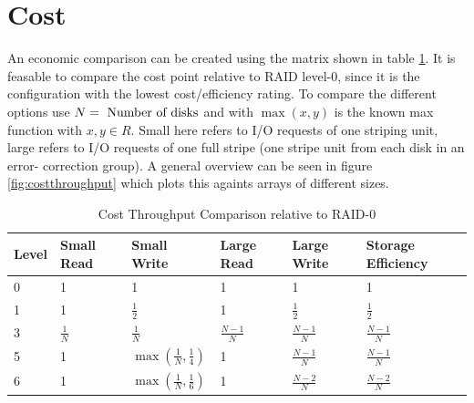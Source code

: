 \documentclass{article}
\begin{document}
\section{Cost}
An economic comparison can be created using the matrix shown in table \ref{tab:economics}.
It is feasable to compare the cost point relative to RAID level-0, since it
is the configuration with the lowest cost/efficiency rating.
To compare the different options use \( N = \textnormal{ Number of disks}\)
and with \(\max\left(x,y\right)\) is the known max function with \( x, y \in R \).
Small here refers to I/O requests of one striping unit, large refers to I/O requests of one full stripe (one stripe unit from each disk in an error-
correction group). A general overview can be seen in figure \ref{fig:costthroughput} which 
plots this againts arrays of different sizes. \cite{cmu:raidhighperf}
\begin{table}[h]
    \begin{tabularx}{\textwidth}{l|X|X|X|X|X}
        \textbf{Level} &
        Small Read &
        Small Write &
        Large Read &
        Large Write &
        Storage Efficiency \\
        \hline
        0 & 1 & 1 & 1 & 1 & 1 \\
        1 & 1 & \( \frac{1}{2} \) & 1 & \( \frac{1}{2} \) & \( \frac{1}{2} \) \\
        3 & \( \frac{1}{N} \) & \( \frac{1}{N} \) & \( \frac{N-1}{N} \) & \( \frac{N-1}{N} \) & \( \frac{N-1}{N} \) \\
        5 & 1 & \( \max\left(\frac{1}{N},\frac{1}{4}\right) \) & 1 & \( \frac{N-1}{N} \) & \( \frac{N-1}{N} \) \\
        6 & 1 & \( \max\left(\frac{1}{N},\frac{1}{6}\right) \) & 1 & \( \frac{N-2}{N} \) & \( \frac{N-2}{N} \) \\
    \end{tabularx}
    \caption{Cost Throughput Comparison relative to RAID-0 \cite{cmu:raidhighperf}}
    \label{tab:economics}
\end{table}
\pagebreak
\end{document}
